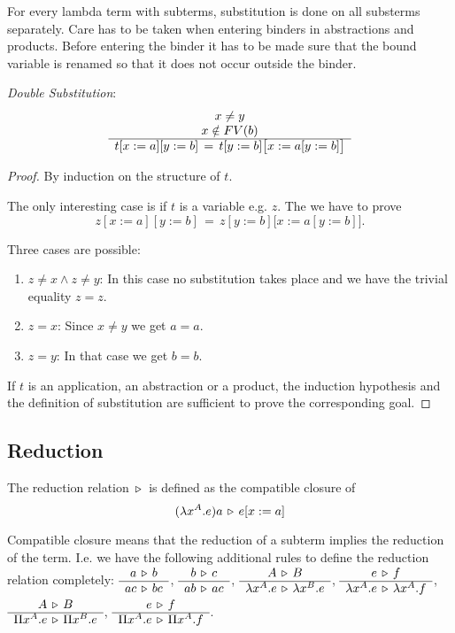 For every lambda term with subterms, substitution is done on all substerms
separately. Care has to be taken when entering binders in abstractions and
products. Before entering the binder it has to be made sure that the bound
variable is renamed so that it does not occur outside the binder.


\begin{lemma}
  \label{doublesubstitution}
  \emph{Double Substitution}:
  $$
  \begin{array}{c} x \neq y
    \\
    x \notin FV(b)
   \\ \hline t[x:=a][y:=b]\, = \, t[y:=b]\big[x:=a[y:=b]\big]\end{array}
  $$
  \begin{proof}
    By induction on the structure of $t$.

    The only interesting case is if $t$ is a variable e.g. $z$. The we have to
    prove
    $$ z[x:=a][y:=b]\, = \, z[y:=b]\big[x:=a[y:=b]\big].$$

    Three cases are possible:
    \begin{enumerate}
    \item
      $z \ne x \land z \ne y$: In this case no substitution takes place and we
      have the trivial equality $z = z$.

    \item $z = x$: Since $x \ne y$ we get $a = a$.

    \item $z = y$: In that case we get $b = b$.
    \end{enumerate}

    If $t$ is an application, an abstraction or a product, the induction
    hypothesis and the definition of substitution are sufficient to prove the
    corresponding goal.
  \end{proof}
\end{lemma}





\subsection{Reduction}

\begin{definition}
  The reduction relation $\,\triangleright\,$ is defined as the compatible closure
  of
  $$
  (\lambda x^A. e) a \,\triangleright\, e[x:=a]
  $$
\end{definition}

Compatible closure means that the reduction of a subterm implies the reduction
of the term. I.e. we have the following additional rules to define the
reduction relation completely:
$\begin{array}{c} a \,\triangleright\, b \\ \hline ac \,\triangleright\, bc\end{array}$,
$\begin{array}{c} b \,\triangleright\, c \\ \hline ab \,\triangleright\, ac\end{array}$,
$\begin{array}{c} A \,\triangleright\, B \\ \hline \lambda x^A.e \,\triangleright\, \lambda x^B. e\end{array}$,
$\begin{array}{c} e \,\triangleright\, f \\ \hline \lambda x^A.e \,\triangleright\, \lambda x^A. f\end{array}$,
$\begin{array}{c} A \,\triangleright\, B \\ \hline \Pi x^A.e \,\triangleright\, \Pi x^B. e\end{array}$,
$\begin{array}{c} e \,\triangleright\, f \\ \hline \Pi x^A.e \,\triangleright\, \Pi x^A. f\end{array}$.



